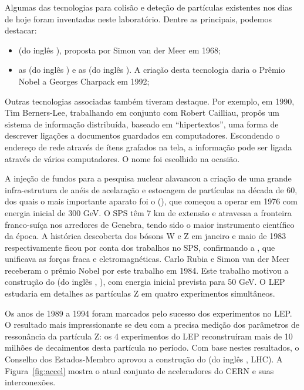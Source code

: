 Algumas das tecnologias para colisão e deteção de partículas existentes nos
dias de hoje foram inventadas neste laboratório. Dentre as principais, podemos
destacar:

\begin{itemize}
\item {} (do inglês
), proposta por Simon van der Meer em
1968;

\item as  (do inglês
) e as  (do
inglês ). A criação desta tecnologia daria o Prêmio
Nobel a Georges Charpack em 1992;
\end{itemize}

Outras tecnologias associadas também tiveram destaque. Por exemplo, em 1990,
Tim Berners-Lee, trabalhando em conjunto com Robert Cailliau, propôs um
sistema de informação distribuída, baseado em ``hipertextos'', uma forma de
descrever ligações a documentos guardados em computadores. Escondendo o
endereço de rede através de ítens grafados na tela, a informação pode ser
ligada através de vários computadores. O nome  foi
escolhido na ocasião.

A injeção de fundos para a pesquisa nuclear alavancou a criação de uma grande
infra-estrutura de anéis de acelaração e estocagem de partículas na década de
60, dos quais o mais importante aparato foi o  (), que começou a operar em 1976 com energia inicial de
300 GeV. O SPS têm 7 km de extensão e atravessa a fronteira franco-suíça nos
arredores de Genebra, tendo sido o maior instrumento científico da época.  A
histórica descoberta dos bósons W e Z em janeiro e maio de 1983
respectivamente ficou por conta dos trabalhos no SPS, confirmando a
, que unificava as forças fraca e
eletromagnéticas. Carlo Rubia e Simon van der Meer
receberam o prêmio Nobel por este trabalho em 1984. Este trabalho motivou a
construção do  (do inglês
, ), com energia inicial
prevista para 50 GeV. O LEP estudaria em detalhes as partículas Z em quatro
experimentos simultâneos.

Os anos de 1989 a 1994 foram marcados pelo sucesso dos experimentos no LEP. O
resultado mais impressionante se deu com a precisa medição dos parâmetros de
ressonância da partícula Z: os 4 experimentos do LEP reconstruíram mais de 10
milhões de decaimentos desta partícula no período. Com base nestes resultados,
o Conselho dos Estados-Membro aprovou a construção do  (do inglês , LHC). A
Figura~\ref{fig:accel} mostra o atual conjunto de aceleradores do CERN e suas
interconexões.

